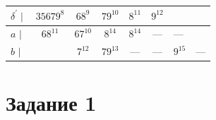 \documentclass[fleqn,12pt, a4paper]{article}
\begin{document}
\begin{enumerate}[label=(\roman{*})]
	\vspace{1em}

	\begin{tabular}{lccccc}
		\toprule
		& 
		& 
		& 
		& 
		& 

		\\
		\midrule

		$a$ $\mid$ &
		$68^{11}$ & $67^{10}$ & $8^{14}$ & $8^{14}$ & --- & ---   \\
		$b$ $\mid$ &
		& $7^{12}$ & $79^{13}$ & --- & --- & $9^{15}$ & --- \\
		\bottomrule
	\end{tabular}

\end{enumerate}

\section*{Задание 1}
\end{document}
